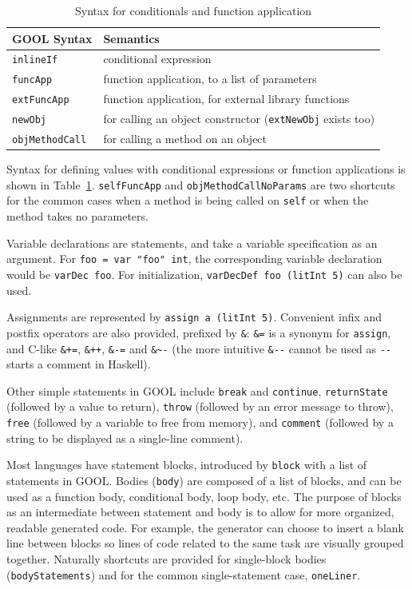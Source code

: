 \documentclass[sigplan,review,anonymous,prologue,dvipsnames]{acmart}
\begin{document}
\begin{table}[!h]
  \caption{Syntax for conditionals and function application}
  \begin{tabular}{p{} p{}}
    \textbf{GOOL Syntax} & \textbf{Semantics} \\
    \midrule
    \verb|inlineIf| & conditional expression \\
    \verb|funcApp| & function application, to a list of parameters \\
    \verb|extFuncApp| & function application, for external library
    functions\\
    \verb|newObj| & for calling an object constructor (\verb|extNewObj|
    exists too) \\
    \verb|objMethodCall| & for calling a method on an object \\
  \end{tabular}
  \label{tab:values}
\end{table}

Syntax for defining values with conditional expressions or function
applications is shown in Table~\ref{tab:values}. \verb|selfFuncApp| and
\verb|objMethodCallNoParams| are two shortcuts for the common cases when a
method is being called on \verb|self| or when the method takes no parameters.

Variable declarations are statements, and take a variable specification
as an argument. For \verb|foo = var "foo" int|, the corresponding variable
declaration would be \verb|varDec foo|.  For initialization, 
\verb|varDecDef foo (litInt 5)| can also be used.

Assignments are represented by \verb|assign a (litInt 5)|. Convenient
infix and postfix operators are also provided, prefixed by \verb|&|:
\verb|&=| is a synonym for \verb|assign|, and C-like
\verb|&+=|, \verb|&++|, \verb|&-=| and \verb|&~-| (the more intuitive
\verb|&--| cannot be used as \verb|--| starts a comment in Haskell).

Other simple statements in GOOL include \verb|break| and \verb|continue|,
\verb|returnState| (followed by a value to return), \verb|throw| (followed by an
error message to throw), \verb|free| (followed by a variable to free from
memory), and \verb|comment| (followed by a string to be displayed as a
single-line comment).

Most languages have statement blocks, introduced by \verb|block| with
a list of statements in GOOL. Bodies (\verb|body|) are composed
of a list of blocks, and can be used as a function body, conditional body, loop
body, etc. The purpose of blocks as an intermediate between statement and body
is to allow for more organized, readable generated code. For example, the
generator can choose to insert a blank line between blocks so lines of code
related to the same task are visually grouped together. Naturally shortcuts
are provided for single-block bodies (\verb|bodyStatements|) and
for the common single-statement case, \verb|oneLiner|.
\end{document}
